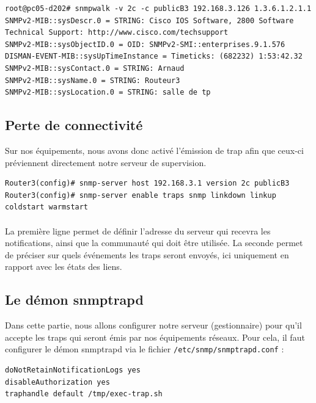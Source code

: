 \documentclass[12pt,a4paper,notitlepage]{article}
\begin{document}
\begin{lstlisting}[title=Vérification du fonctionnement SNMP sur le routeur]
root@pc05-d202# snmpwalk -v 2c -c publicB3 192.168.3.126 1.3.6.1.2.1.1
SNMPv2-MIB::sysDescr.0 = STRING: Cisco IOS Software, 2800 Software
Technical Support: http://www.cisco.com/techsupport
SNMPv2-MIB::sysObjectID.0 = OID: SNMPv2-SMI::enterprises.9.1.576
DISMAN-EVENT-MIB::sysUpTimeInstance = Timeticks: (682232) 1:53:42.32
SNMPv2-MIB::sysContact.0 = STRING: Arnaud
SNMPv2-MIB::sysName.0 = STRING: Routeur3
SNMPv2-MIB::sysLocation.0 = STRING: salle de tp
\end{lstlisting}

\subsection{Perte de connectivité}
Sur nos équipements, nous avons donc activé l'émission de trap afin que ceux-ci préviennent directement notre serveur de supervision.

\begin{lstlisting}[title=Activation des traps pour l'état des liens]
Router3(config)# snmp-server host 192.168.3.1 version 2c publicB3
Router3(config)# snmp-server enable traps snmp linkdown linkup coldstart warmstart
\end{lstlisting}

\paragraph{} La première ligne permet de définir l'adresse du serveur qui recevra les notifications, ainsi que la communauté qui doit être utilisée. La seconde permet de préciser sur quels événements les traps seront envoyés, ici uniquement en rapport avec les états des liens.

\subsection{Le démon snmptrapd}
Dans cette partie, nous allons configurer notre serveur (gestionnaire) pour qu'il accepte les traps qui seront émis par nos équipements réseaux. Pour cela, il faut configurer le démon snmptrapd via le fichier \texttt{/etc/snmp/snmptrapd.conf} :

\begin{lstlisting}[title=Configuration de snmptrapd]
doNotRetainNotificationLogs yes
disableAuthorization yes
traphandle default /tmp/exec-trap.sh
\end{lstlisting}
\end{document}
